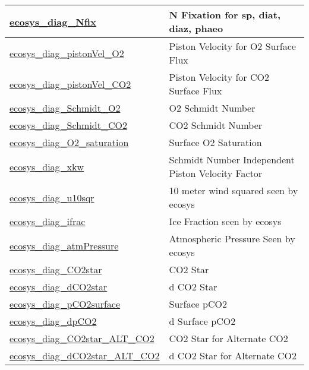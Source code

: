 {\begin{center}
\begin{longtable}{| p{2.0in} | p{4.0in} |}
    \hline
    \hyperref[subsec:var_sec_forcing_ecosys_diag_Nfix]{ecosys\_diag\_Nfix} & N Fixation for sp, diat, diaz, phaeo \\
    \hline
    \hyperref[subsec:var_sec_forcing_ecosys_diag_pistonVel_O2]{ecosys\_diag\_pistonVel\_O2} & Piston Velocity for O2 Surface Flux \\
    \hline
    \hyperref[subsec:var_sec_forcing_ecosys_diag_pistonVel_CO2]{ecosys\_diag\_pistonVel\_CO2} & Piston Velocity for CO2 Surface Flux \\
    \hline
    \hyperref[subsec:var_sec_forcing_ecosys_diag_Schmidt_O2]{ecosys\_diag\_Schmidt\_O2} & O2 Schmidt Number \\
    \hline
    \hyperref[subsec:var_sec_forcing_ecosys_diag_Schmidt_CO2]{ecosys\_diag\_Schmidt\_CO2} & CO2 Schmidt Number \\
    \hline
    \hyperref[subsec:var_sec_forcing_ecosys_diag_O2_saturation]{ecosys\_diag\_O2\_saturation} & Surface O2 Saturation \\
    \hline
    \hyperref[subsec:var_sec_forcing_ecosys_diag_xkw]{ecosys\_diag\_xkw} & Schmidt Number Independent Piston Velocity Factor \\
    \hline
    \hyperref[subsec:var_sec_forcing_ecosys_diag_u10sqr]{ecosys\_diag\_u10sqr} & 10 meter wind squared seen by ecosys \\
    \hline
    \hyperref[subsec:var_sec_forcing_ecosys_diag_ifrac]{ecosys\_diag\_ifrac} & Ice Fraction seen by ecosys \\
    \hline
    \hyperref[subsec:var_sec_forcing_ecosys_diag_atmPressure]{ecosys\_diag\_atmPressure} & Atmospheric Pressure Seen by ecosys \\
    \hline
    \hyperref[subsec:var_sec_forcing_ecosys_diag_CO2star]{ecosys\_diag\_CO2star} & CO2 Star \\
    \hline
    \hyperref[subsec:var_sec_forcing_ecosys_diag_dCO2star]{ecosys\_diag\_dCO2star} & d CO2 Star \\
    \hline
    \hyperref[subsec:var_sec_forcing_ecosys_diag_pCO2surface]{ecosys\_diag\_pCO2surface} & Surface pCO2 \\
    \hline
    \hyperref[subsec:var_sec_forcing_ecosys_diag_dpCO2]{ecosys\_diag\_dpCO2} & d Surface pCO2 \\
    \hline
    \hyperref[subsec:var_sec_forcing_ecosys_diag_CO2star_ALT_CO2]{ecosys\_diag\_CO2star\_ALT\_\-CO2} & CO2 Star for Alternate CO2 \\
    \hline
    \hyperref[subsec:var_sec_forcing_ecosys_diag_dCO2star_ALT_CO2]{ecosys\_diag\_dCO2star\_ALT\_\-CO2} & d CO2 Star for Alternate CO2 \\

\end{longtable}
\end{center}}
